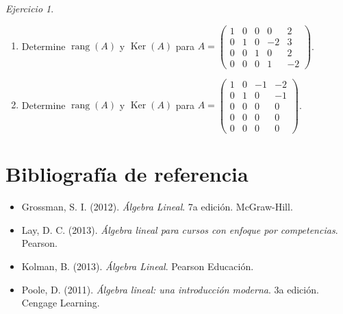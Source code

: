 \documentclass[12pt]{article}
\theoremstyle{remark}
\newtheorem{Ejer}[definicion]{Ejercicio}
\newcommand{\rang}{\operatorname{rang}}
\newcommand{\Ker}{\operatorname{Ker}}
\begin{document}
\begin{Ejer}
\begin{enumerate}[start=213]
\item Determine $\rang(A)$ y $\Ker(A)$ para $A=\begin{pmatrix}1&0&0&0&2\\0&1&0&-2&3\\0&0&1&0&2\\0&0&0&1&-2\end{pmatrix}$.

\item Determine $\rang(A)$ y $\Ker(A)$ para $A=\begin{pmatrix}1&0&-1&-2\\0&1&0&-1\\0&0&0&0\\0&0&0&0\\0&0&0&0\end{pmatrix}$.
\end{enumerate}
\end{Ejer}



\section*{Bibliografía de referencia}
\begin{itemize}
\item Grossman, S. I. (2012). \emph{Álgebra Lineal}. 7a edición. McGraw-Hill.
\item Lay, D. C. (2013). \emph{Álgebra lineal para cursos con enfoque por competencias}. Pearson.
\item Kolman, B. (2013). \emph{Álgebra Lineal}. Pearson Educación.
\item Poole, D. (2011). \emph{Álgebra lineal: una introducción moderna}. 3a edición. Cengage Learning.
\end{itemize}

\vspace{0.8em}
\end{document}
